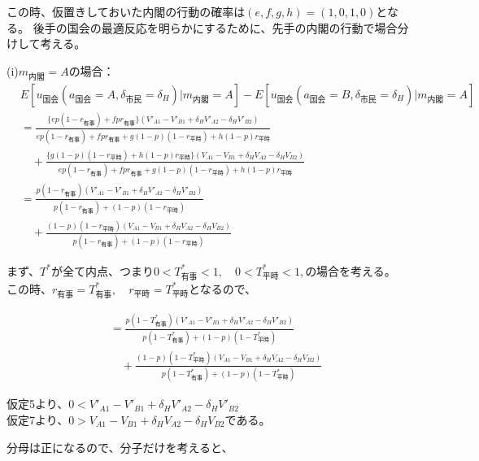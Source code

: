 \documentclass[main.tex]{subfiles}
\begin{document}
この時、仮置きしておいた内閣の行動の確率は$(e,f,g,h) = (1,0,1,0)$となる。
後手の国会の最適反応を明らかにするために、先手の内閣の行動で場合分けして考える。

(i)$m_{内閣}=A$の場合：
\begin{align*}
    & E[u_{国会}(a_{国会}=A, \delta_{市民}=\delta_H) | m_{内閣} = A  ] - E[u_{国会}(a_{国会}=B, \delta_{市民}=\delta_H) | m_{内閣} = A  ]\\[1em]
    &= \frac{ \{ep(1-r_{有事}) +  fpr_{有事}\}(V'_{A1} -V'_{B1} + \delta_H V'_{A2} - \delta_H V'_{B2})  }{ ep(1-r_{有事}) + fpr_{有事} + g(1-p)(1-r_{平時}) + h(1-p)r_{平時} }\\[1em]
    &\quad + \frac{ \{g(1-p)(1-r_{平時}) + h(1-p)r_{平時}\}(V_{A1} - V_{B1} + \delta_H V_{A2} - \delta_H V_{B2} ) }{ ep(1-r_{有事}) + fpr_{有事} + g(1-p)(1-r_{平時}) + h(1-p)r_{平時} }\\[1em]
    &= \frac{ p(1-r_{有事}) (V'_{A1} -V'_{B1} + \delta_H V'_{A2} - \delta_H V'_{B2})  }{ p(1-r_{有事})  + (1-p)(1-r_{平時}) }\\[1em]
    &\quad + \frac{ (1-p)(1-r_{平時})(V_{A1} - V_{B1} + \delta_H V_{A2} - \delta_H V_{B2} ) }{ p(1-r_{有事}) +  (1-p)(1-r_{平時}) }
\end{align*}

\bigskip
まず、$T^*$が全て内点、つまり$0<T^*_{有事}<1,\quad 0<T^*_{平時}<1,$の場合を考える。\\
この時、$r_{有事}=T^*_{有事}, \quad r_{平時} = T^*_{平時}$となるので、

\begin{align*}
    &= \frac{ p(1-T^*_{有事}) (V'_{A1} -V'_{B1} + \delta_H V'_{A2} - \delta_H V'_{B2})  }{ p(1-T^*_{有事})  + (1-p)(1-T^*_{平時}) }\\[1em]
    &\quad + \frac{ (1-p)(1-T^*_{平時})(V_{A1} - V_{B1} + \delta_H V_{A2} - \delta_H V_{B2} ) }{ p(1-T^*_{有事}) +  (1-p)(1-T^*_{平時}) }
\end{align*}


仮定5より、$0 < V'_{A1} -V'_{B1} + \delta_H V'_{A2} - \delta_H V'_{B2} $ \\
仮定7より、$0 > V_{A1} - V_{B1} + \delta_H V_{A2} - \delta_H V_{B2}$である。

分母は正になるので、分子だけを考えると、
\end{document}
